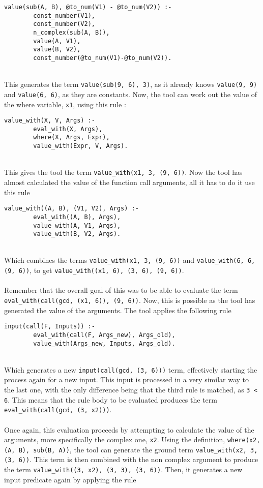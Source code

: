 \begin{lstlisting}
value(sub(A, B), @to_num(V1) - @to_num(V2)) :- 
		const_number(V1), 
		const_number(V2), 
		n_complex(sub(A, B)), 
		value(A, V1), 
		value(B, V2), 
		const_number(@to_num(V1)-@to_num(V2)).
\end{lstlisting}
\mbox{} \\
This generates the term \lstinline{value(sub(9, 6), 3)}, as it already knows \lstinline{value(9, 9)} and \lstinline{value(6, 6)}, as they are constants. Now, the tool can work out the value of the where variable, \lstinline{x1}, using this rule : \\

\begin{lstlisting}
value_with(X, V, Args) :- 
		eval_with(X, Args), 
		where(X, Args, Expr), 
		value_with(Expr, V, Args).
\end{lstlisting}
\mbox{} \\
This gives the tool the term \lstinline{value_with(x1, 3, (9, 6))}. Now the tool has almost calculated the value of the function call arguments, all it has to do it use this rule \\%

\begin{lstlisting}
value_with((A, B), (V1, V2), Args) :- 
		eval_with((A, B), Args), 
		value_with(A, V1, Args), 
		value_with(B, V2, Args).
\end{lstlisting}
\mbox{} \\
Which combines the terms \lstinline{value_with(x1, 3, (9, 6))} and \lstinline{value_with(6, 6, (9, 6))}, to get \lstinline{value_with((x1, 6), (3, 6), (9, 6))}. \\ \\ %
Remember that the overall goal of this was to be able to evaluate the term \lstinline{eval_with(call(gcd, (x1, 6)), (9, 6))}. Now, this is possible as the tool has generated the value of the arguments. The tool applies the following rule \\ %

\begin{lstlisting}
input(call(F, Inputs)) :- 
		eval_with(call(F, Args_new), Args_old), 
		value_with(Args_new, Inputs, Args_old).
\end{lstlisting}
\mbox{} \\
Which generates a new \lstinline{input(call(gcd, (3, 6)))} term, effectively starting the process again for a new input. This input is processed in a very similar way to the last one, with the only difference being that the third rule is matched, as \lstinline{3 < 6}. This means that the rule body to be evaluated produces the term \lstinline{eval_with(call(gcd, (3, x2)))}. \\ \\%
Once again, this evaluation proceeds by attempting to calculate the value of the arguments, more specifically the complex one, \lstinline{x2}. Using the definition, \lstinline{where(x2, (A, B), sub(B, A))}, the tool can generate the ground term \lstinline{value_with(x2, 3, (3, 6))}. This term is then combined with the non complex argument to produce the term \lstinline{value_with((3, x2), (3, 3), (3, 6))}. Then, it generates a new input predicate again by applying the rule \\ 

